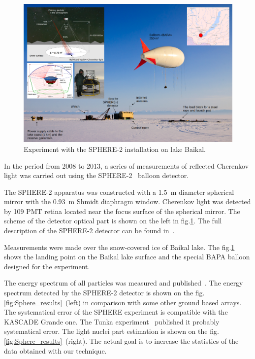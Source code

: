 \documentclass[a4paper,11pt]{article}
\begin{document}
\begin{figure}[t]
\centering
\includegraphics[width=1.0\textwidth]{Sphere2Baikal.png}
\caption{\label{fig:Sphere_Baikal} Experiment with the SPHERE-2 installation on lake Baikal.}
\end{figure}

In the period from 2008 to 2013, a series of measurements of reflected Cherenkov light was carried out using the SPHERE-2~\cite{Ant15a,Ant15c,Ant19} balloon detector. 

The SPHERE-2 apparatus was constructed with a 1.5~m diameter spherical mirror with the 0.93~m Shmidt diaphragm window. Cherenkov light was detected by 109 PMT retina located near the focus surface of the spherical mirror. The scheme of the detector optical part is shown on the left in fig.\ref{fig:Sphere_Baikal}. The full description of the SPHERE-2 detector can be found in~\cite{Ant15a,Ant20}.

Measurements were made over the snow-covered ice of Baikal lake. The fig.\ref{fig:Sphere_Baikal} shows the landing point on the Baikal lake surface and the special BAPA balloon designed for the experiment. 

The energy spectrum of all particles was measured and published~\cite{Ant15c}. The energy spectrum detected by the SPHERE-2 detector is shown on the fig.\ref{fig:Sphere_results}~(left) in comparison with some other ground based arrays. The systematical error of the SPHERE experiment is compatible with the KASCADE Grande one. The Tunka experiment~\cite{Tunka2020} published it probably systematical error. The light nuclei part estimation is shown on the fig.\ref{fig:Sphere_results}~(right). The actual goal is to increase the statistics of the data obtained with our technique.
\end{document}
